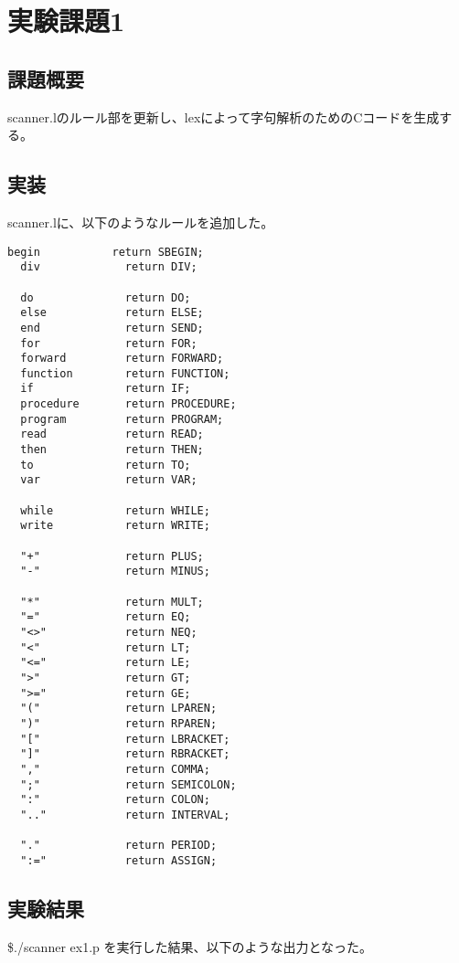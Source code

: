\section{実験課題1}
\subsection{課題概要}
scanner.lのルール部を更新し、lexによって字句解析のためのCコードを生成する。

\subsection{実装}
scanner.lに、以下のようなルールを追加した。

\begin{lstlisting}[caption={scanner.l(ルールの記述)},label={scanner.l(ルールの記述)}]
  begin           return SBEGIN;
  div             return DIV;
  
  do              return DO;
  else            return ELSE;
  end             return SEND;
  for             return FOR;
  forward         return FORWARD;
  function        return FUNCTION;
  if              return IF;
  procedure       return PROCEDURE;
  program         return PROGRAM;
  read            return READ;
  then            return THEN;
  to              return TO;
  var             return VAR;
  
  while           return WHILE;
  write           return WRITE;
  
  "+"             return PLUS;
  "-"             return MINUS;
  
  "*"             return MULT;
  "="             return EQ;
  "<>"            return NEQ;
  "<"             return LT;
  "<="            return LE;
  ">"             return GT;
  ">="            return GE;
  "("             return LPAREN;
  ")"             return RPAREN;
  "["             return LBRACKET;
  "]"             return RBRACKET;
  ","             return COMMA;
  ";"             return SEMICOLON;
  ":"             return COLON;
  ".."            return INTERVAL;
  
  "."             return PERIOD;
  ":="            return ASSIGN;
\end{lstlisting}

\subsection{実験結果}
\$./scanner ex1.p を実行した結果、以下のような出力となった。

